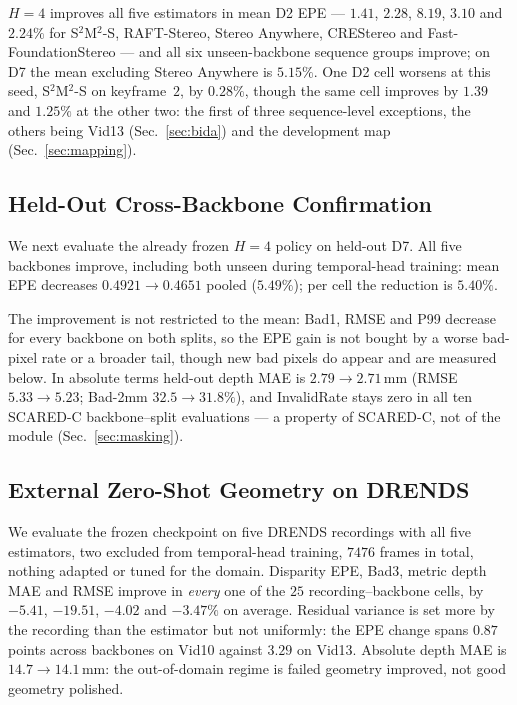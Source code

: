 \documentclass[letterpaper,10pt,conference]{ieeeconf}
\begin{document}
$H=4$ improves all five estimators in mean D2 EPE --- $1.41$, $2.28$,
$8.19$, $3.10$ and $2.24\%$ for S$^2$M$^2$-S, RAFT-Stereo, Stereo Anywhere,
CREStereo and Fast-FoundationStereo --- and all six
unseen-backbone sequence groups improve; on D7 the mean excluding Stereo
Anywhere is $5.15\%$. One D2 cell worsens at this seed, S$^2$M$^2$-S on
keyframe~$2$, by $0.28\%$, though the same cell improves by $1.39$ and
$1.25\%$ at the other two: the first of three sequence-level exceptions, the
others being Vid13 (Sec.~\ref{sec:bida}) and the development map
(Sec.~\ref{sec:mapping}).

\subsection{Held-Out Cross-Backbone Confirmation}
\label{sec:heldout}

We next evaluate the already frozen $H=4$ policy on held-out D7. All five
backbones improve, including both unseen during temporal-head training:
mean EPE decreases $0.4921 \rightarrow 0.4651$ pooled ($5.49\%$); per
cell the reduction is $5.40\%$.

The improvement is not restricted to the mean: Bad1, RMSE and P99 decrease
for every backbone on both splits, so the EPE gain is not bought by a worse
bad-pixel rate or a broader tail, though new bad pixels do appear and are
measured below. In absolute terms held-out depth MAE is $2.79 \to 2.71$\,mm (RMSE $5.33 \to
5.23$; Bad-2mm $32.5 \to 31.8\%$), and InvalidRate stays zero in all ten
SCARED-C backbone--split evaluations --- a property of SCARED-C, not of the
module (Sec.~\ref{sec:masking}).

\subsection{External Zero-Shot Geometry on DRENDS}
\label{sec:drends}

We evaluate the frozen checkpoint on five DRENDS recordings with all five
estimators, two excluded from temporal-head training, $7476$ frames in total,
nothing adapted or tuned for the domain. Disparity EPE, Bad3, metric depth MAE
and RMSE improve in \emph{every} one of the $25$ recording--backbone cells, by
$-5.41$, $-19.51$, $-4.02$ and $-3.47\%$ on average. Residual variance is set
more by the recording than the estimator but not uniformly: the EPE change
spans $0.87$ points across backbones on Vid10 against $3.29$ on Vid13.
Absolute depth MAE is $14.7 \to 14.1$\,mm: the out-of-domain regime is
failed geometry improved, not good geometry polished.
\end{document}
